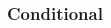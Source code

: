 \vspace{-10pt}
\hrulefill
\vspace{-10pt}
\begin{multicols}{2}
\subsubsection*{Conditional}

\begin{pf}
	\open
		\ellipsesline
	\close
\end{pf}

\vfill\null
\columnbreak

\begin{pf}
\\	
	 
\end{pf}
\end{multicols} %

